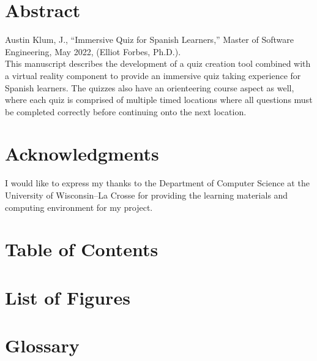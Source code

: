 \documentclass[letterpaper,12pt]{report}
\begin{document}
\hypersetup{pageanchor=false}
	
\clearpage


\clearpage

\hypersetup{pageanchor=true}
\setcounter{page}{1}
\renewcommand\arraystretch{1.5}
\section*{Abstract}
Austin Klum, J., ``Immersive Quiz for Spanish Learners,'' Master of Software Engineering, May 2022, (Elliot Forbes, Ph.D.). \\


This manuscript describes the development of a quiz creation tool combined with a virtual reality component to provide an immersive quiz taking experience for Spanish learners. The quizzes also have an orienteering course aspect as well, where each quiz is comprised of multiple timed locations where all questions must be completed correctly before continuing onto the next location. 
\clearpage

\section*{Acknowledgments}
I would like to express my thanks to the Department of Computer Science at the University of Wisconsin--La Crosse for providing the learning materials and computing environment for my project.
\clearpage

\section*{Table of Contents}
\tableofcontents
\clearpage

\section*{List of Figures}
\listoffigures
\clearpage

\lstlistoflistings
{}
\clearpage


\section*{Glossary}

\clearpage
\end{document}
